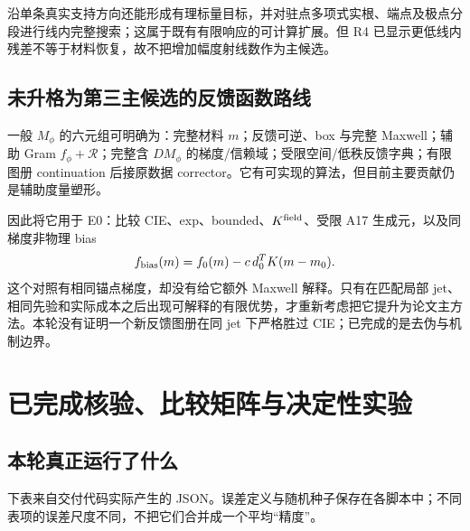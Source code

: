 \documentclass[10pt,a4paper]{article}
\begin{document}
沿单条真实支持方向还能形成有理标量目标，并对驻点多项式实根、端点及极点分段进行线内完整搜索；这属于既有有限响应的可计算扩展。但
R4 已显示更低线内残差不等于材料恢复，故不把增加幅度射线数作为主候选。

\hypertarget{ux672aux5347ux683cux4e3aux7b2cux4e09ux4e3bux5019ux9009ux7684ux53cdux9988ux51fdux6570ux8defux7ebf}{%
\subsection{未升格为第三主候选的反馈函数路线}\label{ux672aux5347ux683cux4e3aux7b2cux4e09ux4e3bux5019ux9009ux7684ux53cdux9988ux51fdux6570ux8defux7ebf}}

一般 \(M_\phi\) 的六元组可明确为：完整材料 \(m\)；反馈可逆、box 与完整
Maxwell；辅助 Gram \(f_\phi+\mathcal R\)；完整含 \(DM_\phi\)
的梯度/信赖域；受限空间/低秩反馈字典；有限图册 continuation 后接原数据
corrector。它有可实现的算法，但目前主要贡献仍是辅助度量塑形。

因此将它用于 E0：比较 CIE、exp、bounded、\(K^{\rm field}\)、受限 A17
生成元，以及同梯度非物理 bias
\[f_{\rm bias}(m)=f_0(m)-c\,d_0^TK(m-m_0).\]
这个对照有相同锚点梯度，却没有给它额外 Maxwell 解释。只有在匹配局部
jet、相同先验和实际成本之后出现可解释的有限优势，才重新考虑把它提升为论文主方法。本轮没有证明一个新反馈图册在同
jet 下严格胜过 CIE；已完成的是去伪与机制边界。

\hypertarget{ux5df2ux5b8cux6210ux6838ux9a8cux6bd4ux8f83ux77e9ux9635ux4e0eux51b3ux5b9aux6027ux5b9eux9a8c}{%
\section{已完成核验、比较矩阵与决定性实验}\label{ux5df2ux5b8cux6210ux6838ux9a8cux6bd4ux8f83ux77e9ux9635ux4e0eux51b3ux5b9aux6027ux5b9eux9a8c}}

\hypertarget{ux672cux8f6eux771fux6b63ux8fd0ux884cux4e86ux4ec0ux4e48}{%
\subsection{本轮真正运行了什么}\label{ux672cux8f6eux771fux6b63ux8fd0ux884cux4e86ux4ec0ux4e48}}

下表来自交付代码实际产生的
JSON。误差定义与随机种子保存在各脚本中；不同表项的误差尺度不同，不把它们合并成一个平均``精度''。
\end{document}
